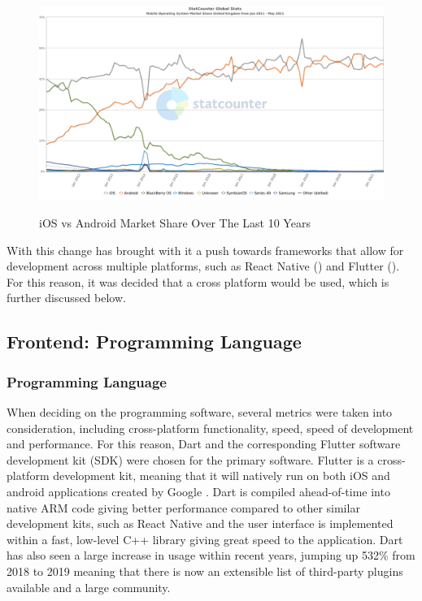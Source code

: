 \documentclass[12pt]{article}
\begin{document}
	\begin{figure}[H]
		\centering
		\includegraphics[scale=0.4]{images/ios-android.png}
		\caption{iOS vs Android Market Share Over The Last 10 Years}
		\label{fig:ios-android}
		\cite{stat-counter-21}
	\end{figure}
	
	With this change has brought with it a push towards frameworks that allow for development across multiple platforms, such as React Native (\cite{https://reactnative.dev/}) and Flutter (\cite{flutter.dev}). For this reason, it was decided that a cross platform would be used, which is further discussed below.
	
	\subsection{Frontend: Programming Language}
	\subsubsection{Programming Language}
	When deciding on the programming software, several metrics were taken into consideration, including cross-platform functionality, speed, speed of development and performance. For this reason, Dart and the corresponding Flutter software development kit (SDK) were chosen for the primary software. Flutter is a cross-platform development kit, meaning that it will natively run on both iOS and android applications created by Google \cite{flutter}. Dart is compiled ahead-of-time into native ARM code giving better performance compared to other similar development kits, such as React Native and the user interface  is implemented within a fast, low-level C++ library giving great speed to the application. Dart has also seen a large increase in usage within recent years, jumping up 532\% from 2018 to 2019 \cite{Github, 2018} meaning that there is now an extensible list of third-party plugins available and a large community.
	
\end{document}
